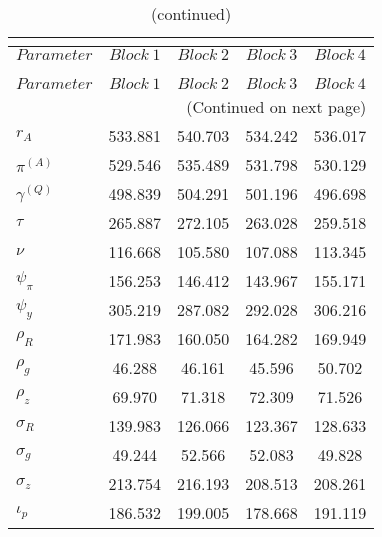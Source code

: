  
\begin{center}
\begin{longtable}{lcccc} 
\caption{MCMC Inefficiency factors per block}\\
 \label{Table:MCMC_inefficiency_factors}\\
\toprule 
$Parameter         $	 & 	 $     Block~1$	 & 	 $     Block~2$	 & 	 $     Block~3$	 & 	 $     Block~4$\\
\midrule \endfirsthead 
\caption{(continued)}\\
 \toprule \\ 
$Parameter         $	 & 	 $     Block~1$	 & 	 $     Block~2$	 & 	 $     Block~3$	 & 	 $     Block~4$\\
\midrule \endhead 
\midrule \multicolumn{5}{r}{(Continued on next page)} \\ \bottomrule \endfoot 
\bottomrule \endlastfoot 
$ {r_{A}}          $	 & 	     533.881	 & 	     540.703	 & 	     534.242	 & 	     536.017 \\ 
$ {\pi^{(A)}}      $	 & 	     529.546	 & 	     535.489	 & 	     531.798	 & 	     530.129 \\ 
$ {\gamma^{(Q)}}   $	 & 	     498.839	 & 	     504.291	 & 	     501.196	 & 	     496.698 \\ 
$ {\tau}           $	 & 	     265.887	 & 	     272.105	 & 	     263.028	 & 	     259.518 \\ 
$ {\nu}            $	 & 	     116.668	 & 	     105.580	 & 	     107.088	 & 	     113.345 \\ 
$ {\psi_\pi}       $	 & 	     156.253	 & 	     146.412	 & 	     143.967	 & 	     155.171 \\ 
$ {\psi_y}         $	 & 	     305.219	 & 	     287.082	 & 	     292.028	 & 	     306.216 \\ 
$ {\rho_R}         $	 & 	     171.983	 & 	     160.050	 & 	     164.282	 & 	     169.949 \\ 
$ {\rho_{g}}       $	 & 	      46.288	 & 	      46.161	 & 	      45.596	 & 	      50.702 \\ 
$ {\rho_z}         $	 & 	      69.970	 & 	      71.318	 & 	      72.309	 & 	      71.526 \\ 
$ {\sigma_R}       $	 & 	     139.983	 & 	     126.066	 & 	     123.367	 & 	     128.633 \\ 
$ {\sigma_{g}}     $	 & 	      49.244	 & 	      52.566	 & 	      52.083	 & 	      49.828 \\ 
$ {\sigma_z}       $	 & 	     213.754	 & 	     216.193	 & 	     208.513	 & 	     208.261 \\ 
$ {\iota_p}        $	 & 	     186.532	 & 	     199.005	 & 	     178.668	 & 	     191.119 \\ 
\end{longtable}
 \end{center}
